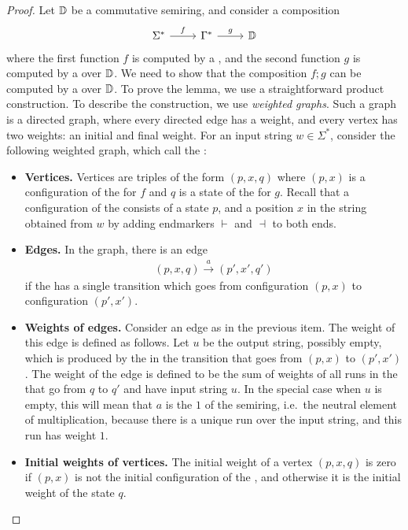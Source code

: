 \begin{proof}
        Let $\mathbb D$ be a commutative semiring, and  consider  a composition 
    \[
    \begin{tikzcd}
    \Sigma^* 
    \ar[r,"f"]
    & 
    \Gamma^*
    \ar[r,"g"]
    &
    \domain
    \end{tikzcd}
    \]
    where the first function $f$ is computed by a , and the second function $g$ is computed by a  over $\mathbb D$. We need to show that the composition $f;g$ can be computed by a  over $\mathbb D$. To prove the lemma, we use a straightforward product construction. To describe the construction, we use \emph{weighted graphs}. Such a graph is a directed graph, where every directed edge has a weight, and every vertex has two weights: an initial and final weight. For an input string $w \in \Sigma^*$, consider the following weighted graph, which call the :
    \begin{itemize}
        \item \textbf{Vertices.} Vertices are triples of the form $(p,x,q)$ where $(p,x)$ is a configuration of the  for $f$ and  $q$ is a state of the  for $g$. Recall that a configuration of the  consists of a state $p$, and a position  $x$  in the string obtained from $w$ by adding endmarkers $\vdash$ and $\dashv$ to both ends. 
        \item \textbf{Edges.} In the graph, there is an edge 
        \begin{align*}
        (p,x,q) \xrightarrow{a} (p',x',q')
        \end{align*}
        if the  has a single transition which goes from configuration $(p,x)$ to configuration $(p',x')$.
        \item \textbf{Weights of edges.} Consider an edge as in the previous item. The weight of this edge is defined as follows. Let $u$ be the output string, possibly empty, which is produced by the  in the transition that goes from $(p,x)$ to $(p',x')$. The weight of the edge is defined to be the  sum of weights of all runs in the  that go from $q$ to $q'$ and have input string $u$. In the special case when $u$ is empty, this will mean that $a$ is the $1$ of the semiring, i.e.~the neutral element of multiplication, because there is a unique run over the input string, and this run has weight $1$. 
        \item \textbf{Initial weights of vertices.} The initial weight of a vertex $(p,x,q)$ is zero if $(p,x)$ is not the initial configuration of the , and otherwise it is the initial weight of  the state $q$.

\end{itemize}
\end{proof}
